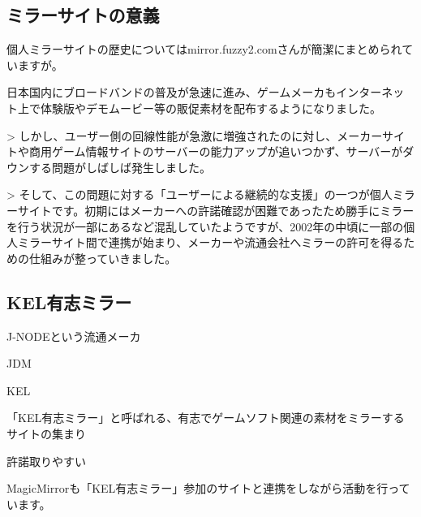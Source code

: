 
 

 

\subsection{ミラーサイトの意義}

個人ミラーサイトの歴史についてはmirror.fuzzy2.comさんが簡潔にまとめられていますが。\cite{fuzzy2_1}

日本国内にブロードバンドの普及が急速に進み、ゲームメーカもインターネット上で体験版やデモムービー等の販促素材を配布するようになりました。

> しかし、ユーザー側の回線性能が急激に増強されたのに対し、メーカーサイトや商用ゲーム情報サイトのサーバーの能力アップが追いつかず、サーバーがダウンする問題がしばしば発生しました。

> そして、この問題に対する「ユーザーによる継続的な支援」の一つが個人ミラーサイトです。初期にはメーカーへの許諾確認が困難であったため勝手にミラーを行う状況が一部にあるなど混乱していたようですが、2002年の中頃に一部の個人ミラーサイト間で連携が始まり、メーカーや流通会社へミラーの許可を得るための仕組みが整っていきました。

 

\subsection{KEL有志ミラー}

 

J-NODEという流通メーカ

JDM

KEL

「KEL有志ミラー」と呼ばれる、有志でゲームソフト関連の素材をミラーするサイトの集まり

 許諾取りやすい

MagicMirrorも「KEL有志ミラー」参加のサイトと連携をしながら活動を行っています。

 

 

 

 

 


 

